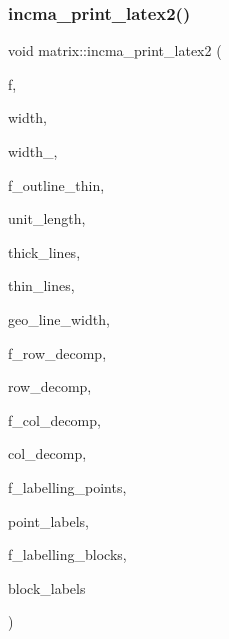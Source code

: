 \subsubsection{\texorpdfstring{incma\+\_\+print\+\_\+latex2()}{incma\_print\_latex2()}}
{\footnotesize\ttfamily void matrix\+::incma\+\_\+print\+\_\+latex2 (\begin{DoxyParamCaption}\item[{ostream \&}]{f,  }\item[{\mbox{\hyperlink{galois_8h_a09fddde158a3a20bd2dcadb609de11dc}{I\+NT}}}]{width,  }\item[{\mbox{\hyperlink{galois_8h_a09fddde158a3a20bd2dcadb609de11dc}{I\+NT}}}]{width\+\_,  }\item[{\mbox{\hyperlink{galois_8h_a09fddde158a3a20bd2dcadb609de11dc}{I\+NT}}}]{f\+\_\+outline\+\_\+thin,  }\item[{const \mbox{\hyperlink{galois_8h_ab6cc7b4aeb6ea31aba2b3fbfc83ff5e6}{B\+Y\+TE}} $\ast$}]{unit\+\_\+length,  }\item[{const \mbox{\hyperlink{galois_8h_ab6cc7b4aeb6ea31aba2b3fbfc83ff5e6}{B\+Y\+TE}} $\ast$}]{thick\+\_\+lines,  }\item[{const \mbox{\hyperlink{galois_8h_ab6cc7b4aeb6ea31aba2b3fbfc83ff5e6}{B\+Y\+TE}} $\ast$}]{thin\+\_\+lines,  }\item[{const \mbox{\hyperlink{galois_8h_ab6cc7b4aeb6ea31aba2b3fbfc83ff5e6}{B\+Y\+TE}} $\ast$}]{geo\+\_\+line\+\_\+width,  }\item[{\mbox{\hyperlink{galois_8h_a09fddde158a3a20bd2dcadb609de11dc}{I\+NT}}}]{f\+\_\+row\+\_\+decomp,  }\item[{\mbox{\hyperlink{class_vector}{Vector}} \&}]{row\+\_\+decomp,  }\item[{\mbox{\hyperlink{galois_8h_a09fddde158a3a20bd2dcadb609de11dc}{I\+NT}}}]{f\+\_\+col\+\_\+decomp,  }\item[{\mbox{\hyperlink{class_vector}{Vector}} \&}]{col\+\_\+decomp,  }\item[{\mbox{\hyperlink{galois_8h_a09fddde158a3a20bd2dcadb609de11dc}{I\+NT}}}]{f\+\_\+labelling\+\_\+points,  }\item[{\mbox{\hyperlink{class_vector}{Vector}} \&}]{point\+\_\+labels,  }\item[{\mbox{\hyperlink{galois_8h_a09fddde158a3a20bd2dcadb609de11dc}{I\+NT}}}]{f\+\_\+labelling\+\_\+blocks,  }\item[{\mbox{\hyperlink{class_vector}{Vector}} \&}]{block\+\_\+labels }\end{DoxyParamCaption})}

